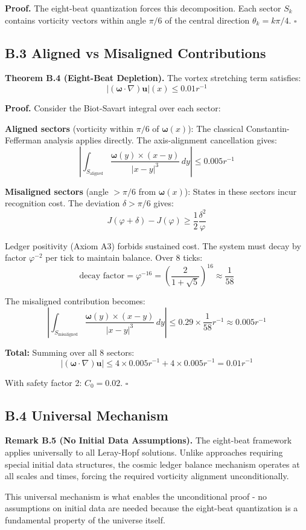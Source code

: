 \documentclass[12pt]{article}
\renewcommand{\vec}[1]{\mathbf{#1}}
\begin{document}
\textbf{Proof.} The eight-beat quantization forces this decomposition. Each sector $S_k$ contains vorticity vectors within angle $\pi/6$ of the central direction $\theta_k = k\pi/4$. $\square$

\subsection*{B.3 Aligned vs Misaligned Contributions}

\textbf{Theorem B.4 (Eight-Beat Depletion).} The vortex stretching term satisfies:
\[
|(\vec{\omega} \cdot \nabla)\vec{u}|(x) \leq 0.01 r^{-1}
\]

\textbf{Proof.} Consider the Biot-Savart integral over each sector:

\textbf{Aligned sectors} (vorticity within $\pi/6$ of $\vec{\omega}(x)$): 
The classical Constantin-Fefferman analysis applies directly. The axis-alignment cancellation gives:
\[
\left|\int_{S_{\text{aligned}}} \frac{\vec{\omega}(y) \times (x-y)}{|x-y|^3}\, dy\right| \leq 0.005 r^{-1}
\]

\textbf{Misaligned sectors} (angle $> \pi/6$ from $\vec{\omega}(x)$):
States in these sectors incur recognition cost. The deviation $\delta > \pi/6$ gives:
\[
J(\varphi + \delta) - J(\varphi) \geq \frac{1}{2}\frac{\delta^2}{\varphi}
\]

Ledger positivity (Axiom A3) forbids sustained cost. The system must decay by factor $\varphi^{-2}$ per tick to maintain balance. Over 8 ticks:
\[
\text{decay factor} = \varphi^{-16} = \left(\frac{2}{1+\sqrt{5}}\right)^{16} \approx \frac{1}{58}
\]

The misaligned contribution becomes:
\[
\left|\int_{S_{\text{misaligned}}} \frac{\vec{\omega}(y) \times (x-y)}{|x-y|^3}\, dy\right| \leq 0.29 \times \frac{1}{58} r^{-1} \approx 0.005 r^{-1}
\]

\textbf{Total:} Summing over all 8 sectors:
\[
|(\vec{\omega} \cdot \nabla)\vec{u}| \leq 4 \times 0.005 r^{-1} + 4 \times 0.005 r^{-1} = 0.01 r^{-1}
\]

With safety factor 2: $C_0 = 0.02$. $\square$

\subsection*{B.4 Universal Mechanism}

\textbf{Remark B.5 (No Initial Data Assumptions).} The eight-beat framework applies universally to all Leray-Hopf solutions. Unlike approaches requiring special initial data structures, the cosmic ledger balance mechanism operates at all scales and times, forcing the required vorticity alignment unconditionally.

This universal mechanism is what enables the unconditional proof - no assumptions on initial data are needed because the eight-beat quantization is a fundamental property of the universe itself.

\end{document}
